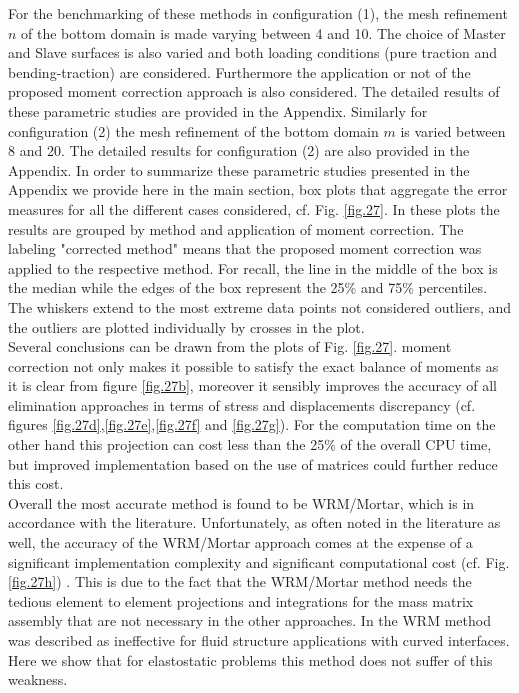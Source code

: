  For the benchmarking of these methods in configuration (1), the mesh refinement $n$ of the bottom domain is made varying between 4 and 10.  The choice of Master and Slave surfaces is also varied and both loading conditions (pure traction and bending-traction) are considered. Furthermore the application or not of the proposed moment correction approach is also considered. The detailed results of these parametric studies are provided in the Appendix.  Similarly for configuration (2) the mesh refinement of the bottom domain $m$ is varied between 8 and 20. The detailed results for configuration (2) are also provided in the Appendix. In order to summarize these parametric studies presented in the Appendix we provide here in the main section, box plots that aggregate the error measures for all the different cases considered, cf. Fig. \ref{fig.27}. In these plots the results are grouped by method and application of moment correction. The labeling "corrected method" means that the proposed moment correction was applied to the respective method. For recall, the line in the middle of the box is the median while the edges of the box represent the 25\% and 75\% percentiles. The whiskers extend to the most extreme data points not considered outliers, and the outliers are plotted individually by crosses in the plot.
 \\
 Several conclusions can be drawn from the plots of Fig. \ref{fig.27}.
  moment correction not only makes it possible to satisfy the exact balance of moments as it is clear from figure \ref{fig.27b}, moreover it sensibly improves the accuracy of all elimination approaches in terms of stress and displacements discrepancy (cf. figures \ref{fig.27d},\ref{fig.27e},\ref{fig.27f} and \ref{fig.27g}). For the computation time on the other hand this projection can cost less than the 25$\%$ of the overall CPU time, but improved implementation based on the use of matrices could further reduce this cost.   
 \\
 Overall the most accurate method is found to be WRM/Mortar, which is in accordance with the literature. Unfortunately, as often noted in the literature as well, the accuracy of the WRM/Mortar approach comes at the expense of a significant implementation complexity and significant computational cost (cf. Fig. \ref{fig.27h}) . This is due to the fact that the WRM/Mortar method needs the tedious element to element projections and integrations for the mass matrix assembly that are not necessary in the other approaches. In \cite{de2007review} the WRM method was described as ineffective for fluid structure applications with curved interfaces. Here we show that for elastostatic problems this method does not suffer of this weakness. 
